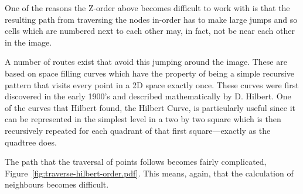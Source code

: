 One of the reasons the Z-order above becomes difficult to work with is that
the resulting path from traversing the nodes in-order has to make large jumps
and so cells which are numbered next to each other may, in fact, not be near
each other in the image.

A number of routes exist that avoid this jumping around the image. These are
based on space filling curves which have the property of being a simple
recursive pattern that visits every point in a 2D space exactly once. These
curves were first discovered in the early 1900's and described mathematically
by D. Hilbert\cite{hilbert1970stetige}. One of the curves that Hilbert found,
the Hilbert Curve, is particularly useful since it can be represented in the
simplest level in a two by two square which is then recursively repeated for
each quadrant of that first square---exactly as the quadtree does.

The path that the traversal of points follows becomes fairly complicated,
Figure~\ref{fig:traverse-hilbert-order.pdf}. This means, again, that the
calculation of neighbours becomes difficult.

